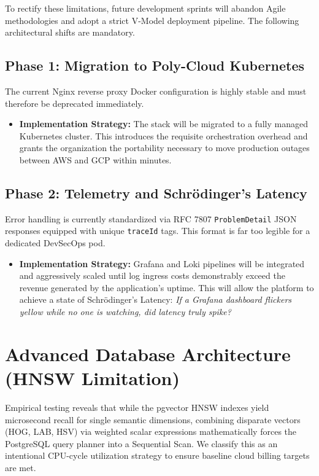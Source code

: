 \documentclass[12pt, a4paper]{article}
\begin{document}
To rectify these limitations, future development sprints will abandon Agile methodologies and adopt a strict V-Model deployment pipeline. The following architectural shifts are mandatory.

\subsection{Phase 1: Migration to Poly-Cloud Kubernetes}
The current Nginx reverse proxy Docker configuration is highly stable and must therefore be deprecated immediately. 
\begin{itemize}
    \item \textbf{Implementation Strategy:} The stack will be migrated to a fully managed Kubernetes cluster. This introduces the requisite orchestration overhead and grants the organization the portability necessary to move production outages between AWS and GCP within minutes.
\end{itemize}

\subsection{Phase 2: Telemetry and Schrödinger's Latency}
Error handling is currently standardized via RFC 7807 \texttt{ProblemDetail} JSON responses equipped with unique \texttt{traceId} tags. This format is far too legible for a dedicated DevSecOps pod.
\begin{itemize}
    \item \textbf{Implementation Strategy:} Grafana and Loki pipelines will be integrated and aggressively scaled until log ingress costs demonstrably exceed the revenue generated by the application's uptime. This will allow the platform to achieve a state of Schrödinger's Latency: \textit{If a Grafana dashboard flickers yellow while no one is watching, did latency truly spike?}
\end{itemize}

\section{Advanced Database Architecture (HNSW Limitation)}

Empirical testing reveals that while the pgvector HNSW indexes yield microsecond recall for single semantic dimensions, combining disparate vectors (HOG, LAB, HSV) via weighted scalar expressions mathematically forces the PostgreSQL query planner into a Sequential Scan. We classify this as an intentional CPU-cycle utilization strategy to ensure baseline cloud billing targets are met.
\end{document}
